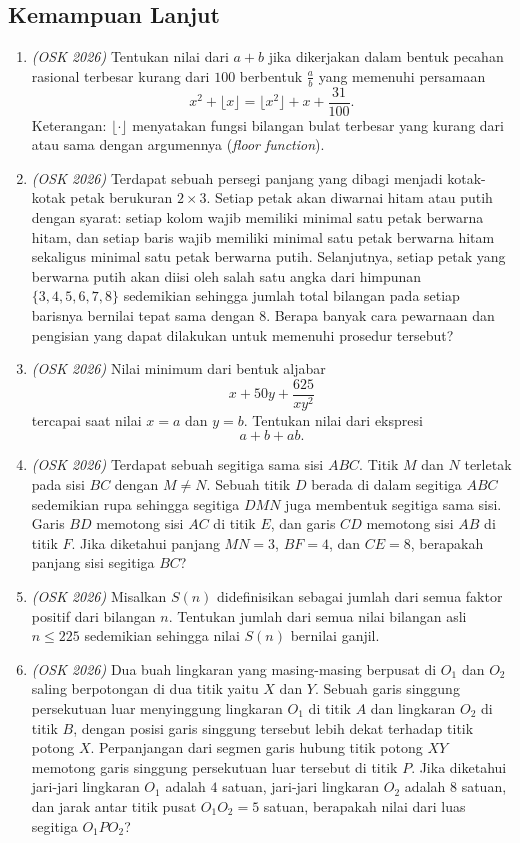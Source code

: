 \subsection{Kemampuan Lanjut}
\begin{enumerate}
	\item \textit{(OSK 2026)} Tentukan nilai dari $a+b$ jika dikerjakan dalam bentuk pecahan rasional terbesar kurang dari $100$ berbentuk $\frac{a}{b}$ yang memenuhi persamaan
	\[
	x^2+\lfloor x\rfloor=\lfloor x^2\rfloor+x+\frac{31}{100}.
	\]
	Keterangan: $\lfloor\cdot\rfloor$ menyatakan fungsi bilangan bulat terbesar yang kurang dari atau sama dengan argumennya (\emph{floor function}).
	
	\item \textit{(OSK 2026)} Terdapat sebuah persegi panjang yang dibagi menjadi kotak-kotak petak berukuran $2\times3$. Setiap petak akan diwarnai hitam atau putih dengan syarat: setiap kolom wajib memiliki minimal satu petak berwarna hitam, dan setiap baris wajib memiliki minimal satu petak berwarna hitam sekaligus minimal satu petak berwarna putih. Selanjutnya, setiap petak yang berwarna putih akan diisi oleh salah satu angka dari himpunan $\{3,4,5,6,7,8\}$ sedemikian sehingga jumlah total bilangan pada setiap barisnya bernilai tepat sama dengan $8$. Berapa banyak cara pewarnaan dan pengisian yang dapat dilakukan untuk memenuhi prosedur tersebut?
	
	\item \textit{(OSK 2026)} Nilai minimum dari bentuk aljabar
	\[
	x+50y+\frac{625}{xy^2}
	\]
	tercapai saat nilai $x=a$ dan $y=b$. Tentukan nilai dari ekspresi
	\[
	a+b+ab.
	\]
	
	\item \textit{(OSK 2026)} Terdapat sebuah segitiga sama sisi $ABC$. Titik $M$ dan $N$ terletak pada sisi $BC$ dengan $M\neq N$. Sebuah titik $D$ berada di dalam segitiga $ABC$ sedemikian rupa sehingga segitiga $DMN$ juga membentuk segitiga sama sisi. Garis $BD$ memotong sisi $AC$ di titik $E$, dan garis $CD$ memotong sisi $AB$ di titik $F$. Jika diketahui panjang $MN=3$, $BF=4$, dan $CE=8$, berapakah panjang sisi segitiga $BC$?
	
	\item \textit{(OSK 2026)} Misalkan $S(n)$ didefinisikan sebagai jumlah dari semua faktor positif dari bilangan $n$. Tentukan jumlah dari semua nilai bilangan asli $n\le225$ sedemikian sehingga nilai $S(n)$ bernilai ganjil.
	
	\item \textit{(OSK 2026)} Dua buah lingkaran yang masing-masing berpusat di $O_1$ dan $O_2$ saling berpotongan di dua titik yaitu $X$ dan $Y$. Sebuah garis singgung persekutuan luar menyinggung lingkaran $O_1$ di titik $A$ dan lingkaran $O_2$ di titik $B$, dengan posisi garis singgung tersebut lebih dekat terhadap titik potong $X$. Perpanjangan dari segmen garis hubung titik potong $XY$ memotong garis singgung persekutuan luar tersebut di titik $P$. Jika diketahui jari-jari lingkaran $O_1$ adalah $4$ satuan, jari-jari lingkaran $O_2$ adalah $8$ satuan, dan jarak antar titik pusat $O_1O_2=5$ satuan, berapakah nilai dari luas segitiga $O_1PO_2$?
	

\end{enumerate}
